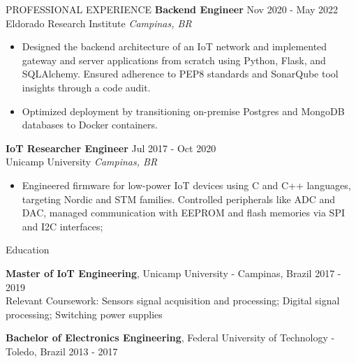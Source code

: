 \documentclass{resume} %
\begin{document}
\begin{rSection}{PROFESSIONAL EXPERIENCE}
\textbf{Backend Engineer} \hfill Nov 2020 - May 2022\\
Eldorado Research Institute \hfill \textit{Campinas, BR}
 \begin{itemize}
    \itemsep -3pt {} 
     \item Designed the backend architecture of an IoT network and implemented gateway and server applications from scratch using Python, Flask, and SQLAlchemy. Ensured adherence to PEP8 standards and SonarQube tool insights through a code audit.
     \item Optimized deployment by transitioning on-premise Postgres and MongoDB databases to Docker containers.
 \end{itemize}

\textbf{IoT Researcher Engineer} \hfill Jul 2017 - Oct 2020\\
Unicamp University \hfill \textit{Campinas, BR}
 \begin{itemize}
    \itemsep -3pt {} 
     \item Engineered firmware for low-power IoT devices using C and C++ languages, targeting Nordic and STM families. Controlled peripherals like ADC and DAC, managed communication with EEPROM and flash memories via SPI and I2C interfaces;
 \end{itemize}

\end{rSection} 


\begin{rSection}{Education}

    {\bf Master of IoT Engineering}, Unicamp University - Campinas, Brazil \hfill {2017 - 2019}\\
    Relevant Coursework: Sensors signal acquisition and processing; Digital signal processing; Switching power supplies
    
    {\bf Bachelor of Electronics Engineering}, Federal University of Technology - Toledo, Brazil  \hfill {2013 - 2017}
    
    
    \end{rSection}
    
\end{document}
